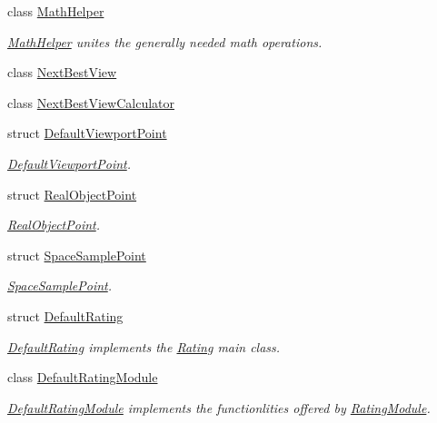\begin{DoxyCompactItemize}
class \hyperlink{classnext__best__view_1_1MathHelper}{\-Math\-Helper}
\begin{DoxyCompactList}\small\item\em \hyperlink{classnext__best__view_1_1MathHelper}{\-Math\-Helper} unites the generally needed math operations. \end{DoxyCompactList}\item 
class \hyperlink{classnext__best__view_1_1NextBestView}{\-Next\-Best\-View}
\item 
class \hyperlink{classnext__best__view_1_1NextBestViewCalculator}{\-Next\-Best\-View\-Calculator}
\item 
struct \hyperlink{structnext__best__view_1_1DefaultViewportPoint}{\-Default\-Viewport\-Point}
\begin{DoxyCompactList}\small\item\em \hyperlink{structnext__best__view_1_1DefaultViewportPoint}{\-Default\-Viewport\-Point}. \end{DoxyCompactList}\item 
struct \hyperlink{structnext__best__view_1_1RealObjectPoint}{\-Real\-Object\-Point}
\begin{DoxyCompactList}\small\item\em \hyperlink{structnext__best__view_1_1RealObjectPoint}{\-Real\-Object\-Point}. \end{DoxyCompactList}\item 
struct \hyperlink{structnext__best__view_1_1SpaceSamplePoint}{\-Space\-Sample\-Point}
\begin{DoxyCompactList}\small\item\em \hyperlink{structnext__best__view_1_1SpaceSamplePoint}{\-Space\-Sample\-Point}. \end{DoxyCompactList}\item 
struct \hyperlink{structnext__best__view_1_1DefaultRating}{\-Default\-Rating}
\begin{DoxyCompactList}\small\item\em \hyperlink{structnext__best__view_1_1DefaultRating}{\-Default\-Rating} implements the \hyperlink{structnext__best__view_1_1Rating}{\-Rating} main class. \end{DoxyCompactList}\item 
class \hyperlink{classnext__best__view_1_1DefaultRatingModule}{\-Default\-Rating\-Module}
\begin{DoxyCompactList}\small\item\em \hyperlink{classnext__best__view_1_1DefaultRatingModule}{\-Default\-Rating\-Module} implements the functionlities offered by \hyperlink{classnext__best__view_1_1RatingModule}{\-Rating\-Module}. \end{DoxyCompactList}\item 

\end{DoxyCompactItemize}
